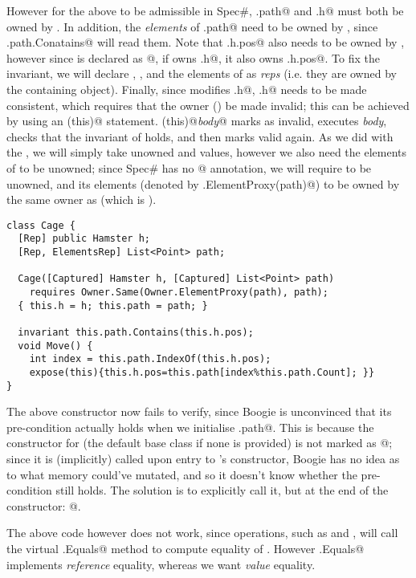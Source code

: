 However for the above \Q@invariant@ to be admissible in Spec\#, \Q@this.path@ and \Q@this.h@ must both be owned by \Q@this@. In addition, the \emph{elements} of \Q@this.path@ need to be owned by \Q@this@, since \Q@this.path.Conatains@ will read them. Note that \Q@this.h.pos@ also needs to be owned by \Q@this@, however since \Q@pos@ is declared as \Q@[Peer]@, if \Q@this@ owns \Q@this.h@, it also owns \Q@this.h.pos@. To fix the invariant, we will declare \Q@h@, \Q@path@, and the elements of \Q@path@ as \emph{reps} (i.e. they are owned by the containing object). Finally, since \Q@Move@ modifies \Q@this.h@, \Q@this.h@ needs to be made consistent, which requires that the owner (\Q@this@) be made invalid; this can be achieved by using an \Q@expose(this)@ statement. \Q@expose(this){@\emph{body}\Q@}@ marks \Q@this@ as invalid, executes \emph{body}, checks that the invariant of \Q@this@ holds, and then marks \Q@this@ valid again.
As we did with the \Q@Hamster@, we will simply take unowned \Q@h@ and \Q@path@ values, however we also need the elements of \Q@path@ to be unowned; since Spec\# has no \Q@[ElementsCaptured]@ annotation, we will require \Q@path@ to be unowned, and its elements (denoted by \Q@Owner.ElementProxy(path)@) to be owned by the same owner as \Q@path@ (which is \Q@null@).
\begin{lstlisting}
class Cage {
  [Rep] public Hamster h;
  [Rep, ElementsRep] List<Point> path;
	
  Cage([Captured] Hamster h, [Captured] List<Point> path)
    requires Owner.Same(Owner.ElementProxy(path), path);
  { this.h = h; this.path = path; }
	
  invariant this.path.Contains(this.h.pos);
  void Move() { 
    int index = this.path.IndexOf(this.h.pos);
    expose(this){this.h.pos=this.path[index%this.path.Count]; }} 
}
\end{lstlisting}

The above constructor now fails to verify, since Boogie is unconvinced that its pre-condition actually holds when we initialise \Q@this.path@. This is because the constructor for \Q@Object@ (the default base class if none is provided) is not marked as \Q@[Pure]@; since it is (implicitly) called upon entry to \Q@Cage@'s constructor, Boogie has no idea as to what memory could've mutated, and so it doesn't know whether the pre-condition still holds. The solution is to explicitly call it, but at the end of the constructor: @.

The above \Q@Cage@ code however does not work, since \Q@List@ operations, such as \Q@Contains@ and \Q@IndexOf@, will call the virtual \Q@Object.Equals@ method to compute equality of \Q@Point@s. However \Q@Object.Equals@ implements \emph{reference} equality, whereas we want \emph{value} equality.

